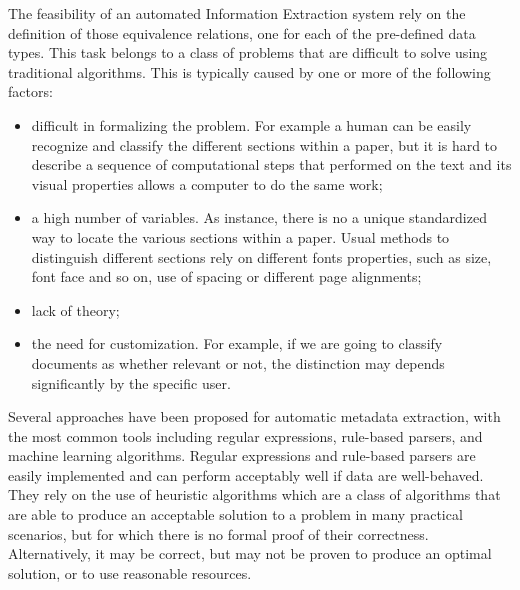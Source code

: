 The feasibility of an automated Information Extraction system rely on the definition of those equivalence relations, one for each of the pre-defined data types. This task belongs to a class of problems that are difficult to solve using traditional algorithms. This is typically caused by one or more of the following factors:
\begin{itemize}
 \item difficult in formalizing the problem. For example a human can be easily recognize and classify the different sections within a paper, but it is hard to describe a sequence of computational steps that performed on the text and its visual properties allows a computer to do the same work;
 \item a high number of variables. As instance, there is no a unique standardized way to locate the various sections within a paper. Usual methods to distinguish different sections rely on different fonts properties, such as size, font face and so on, use of spacing or different page alignments;
 \item lack of theory;
 \item the need for customization. For example, if we are going to classify documents as whether relevant or not, the distinction may depends significantly by the specific user.
\end{itemize}

Several approaches have been proposed for automatic metadata extraction, with the most common tools including regular expressions, rule-based parsers, and machine learning algorithms. Regular expressions and rule-based parsers are easily implemented and can perform acceptably well if data are well-behaved. They rely on the use of heuristic algorithms which are a class of algorithms that are able to produce an acceptable solution to a problem in many practical scenarios, but for which there is no formal proof of their correctness. Alternatively, it may be correct, but may not be proven to produce an optimal solution, or to use reasonable resources.

